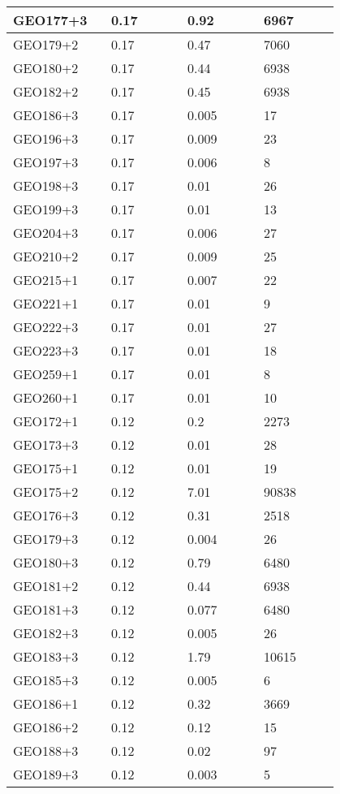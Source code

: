 \begin{longtable}[H]{|p{0.2\linewidth}|p{0.2\linewidth}|p{0.2\linewidth}|p{0.2\linewidth}|}
\hline
GEO177+3 & 0.17 & 0.92 & 6967 \\
\hline
GEO179+2 & 0.17 & 0.47 & 7060 \\
\hline
GEO180+2 & 0.17 & 0.44 & 6938 \\
\hline
GEO182+2 & 0.17 & 0.45 & 6938 \\
\hline
GEO186+3 & 0.17 &  0.005 & 17 \\
\hline
GEO196+3 & 0.17 & 0.009 & 23 \\
\hline
GEO197+3 & 0.17 & 0.006 & 8 \\
\hline
GEO198+3 & 0.17 & 0.01 & 26 \\
\hline
GEO199+3 & 0.17 & 0.01 & 13 \\
\hline
GEO204+3 & 0.17 & 0.006 & 27 \\
\hline
GEO210+2 & 0.17 & 0.009 & 25 \\
\hline
GEO215+1 & 0.17 & 0.007 & 22 \\
\hline
GEO221+1 & 0.17 & 0.01 & 9  \\
\hline
GEO222+3 & 0.17 & 0.01 & 27  \\
\hline
GEO223+3 & 0.17 & 0.01 & 18  \\
\hline
GEO259+1 & 0.17 & 0.01 & 8  \\
\hline
GEO260+1 & 0.17 & 0.01 & 10 \\
\hline
GEO172+1 & 0.12 &  0.2 & 2273 \\
\hline
GEO173+3 & 0.12 &  0.01 & 28 \\
\hline
GEO175+1 & 0.12 &  0.01 & 19 \\
\hline
GEO175+2 & 0.12 &  7.01 & 90838 \\
\hline
GEO176+3 & 0.12 &  0.31 & 2518 \\
\hline
GEO179+3 & 0.12 &  0.004 & 26 \\
\hline
GEO180+3 & 0.12 &  0.79 & 6480 \\
\hline
GEO181+2 & 0.12 &  0.44 & 6938 \\
\hline
GEO181+3 & 0.12 &  0.077 & 6480 \\
\hline
GEO182+3 & 0.12 &  0.005 & 26 \\
\hline
GEO183+3 & 0.12 &  1.79 & 10615 \\
\hline
GEO185+3 & 0.12 &  0.005 & 6 \\
\hline
GEO186+1 & 0.12 &  0.32 & 3669 \\
\hline
GEO186+2 & 0.12 &  0.12 & 15 \\
\hline
GEO188+3 & 0.12 &  0.02 & 97 \\
\hline
GEO189+3 & 0.12 &  0.003 & 5 \\

\end{longtable}
